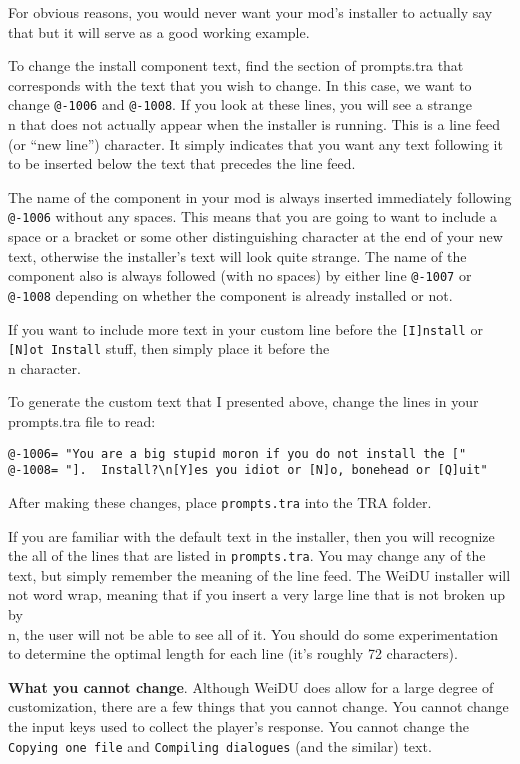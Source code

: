 \documentclass{article}
\def\t#1{{\tt #1}}
\begin{document}
For obvious reasons, you would never want your mod's installer to
actually say that but it will serve as a good working example.

To change the install component text, find the section of prompts.tra that
corresponds with the text that you wish to change.  In this case, we want
to change \t{@-1006} and \t{@-1008}.  If you look at these lines, you will
see a strange \\n that does not actually appear when the installer is
running.  This is a line feed (or ``new line'') character.  It simply
indicates that you want any text following it to be inserted below the text
that precedes the line feed.

The name of the component in your mod is always inserted immediately
following \t{@-1006} without any spaces.  This means that you are going to
want to include a space or a bracket or some other distinguishing character
at the end of your new text, otherwise the installer's text will look
quite strange.  The name of the component also is always followed (with no
spaces) by either line \t{@-1007} or \t{@-1008} depending on whether the
component is already installed or not.

If you want to include more text in your custom line before the \t{[I]nstall} or
\t{[N]ot Install} stuff, then simply place it before the \\n character.

To generate the custom text that I presented above, change the lines in
your prompts.tra file to read:
\begin{verbatim}
@-1006= "You are a big stupid moron if you do not install the ["
@-1008= "].  Install?\n[Y]es you idiot or [N]o, bonehead or [Q]uit"
\end{verbatim}

After making these changes, place \t{prompts.tra} into the TRA folder.

If you are familiar with the default text in the installer, then you will
recognize the all of the lines that are listed in \t{prompts.tra}.  You may
change any of the text, but simply remember the meaning of the line feed.
The WeiDU installer will not word wrap, meaning that if you insert
a very large line that is not broken up by \\n, the user will not be able
to see all of it.  You should do some experimentation to determine the
optimal length for each line (it's roughly 72 characters).

{\bf What you cannot change}.
Although WeiDU does allow for a large degree of customization, there are a
few things that you cannot change. You cannot change the input keys used to
collect the player's response. You cannot change the \t{Copying one file}
and \t{Compiling dialogues} (and the similar) text.
\end{document}

